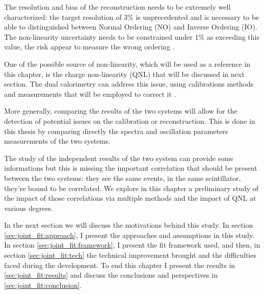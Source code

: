 \documentclass[../main.tex]{subfiles}
\begin{document}
The resolution and bias of the reconstruction needs to be extremely well characterized: the target resolution of 3\% \cite{juno_collaboration_juno_2022} is unprecedented and is necessary to be able to distinguished between Normal Ordering (NO) and Inverse Ordering (IO). The non-linearity uncertainty needs to be constrained under 1\% as exceeding this value, the risk appear to measure the wrong ordering \cite{han_dual_2021}.

One of the possible source of non-linearity, which will be used as a reference in this chapter, is the charge non-linearity (QNL) that will be discussed in next section. The dual calorimetry can address this issue, using calibrations methods and measurements that will be employed to correct it \cite{han_dual_2021}.

More generally, comparing the results of the two systems will allow for the detection of potential issues on the calibration or reconstruction. This is done in this thesis by comparing directly the spectra and oscillation parameters measurements of the two systems.

The study of the independent results of the two system can provide some informations \cite{cabrera_multi-calorimetry_2023} but this is missing the important correlation that should be present between the two systems: they see the same events, in the same scintillator, they're bound to be correlated. We explore in this chapter a preliminary study of the impact of those correlations via multiple methods and the impact of QNL at various degrees.

In the next section we will discuss the motivations behind this study. In section \ref{sec:joint_fit:approach}, I present the approaches and assumptions in this study. In section \ref{sec:joint_fit:framework}, I present the fit framework used, and then, in section \ref{sec:joint_fit:tech} the technical improvement brought and the difficulties faced during the development. To end this chapter I present the results in \ref{sec:joint_fit:results} and discuss the conclusions and perspectives in \ref{sec:joint_fit:conclusion}.
\end{document}
